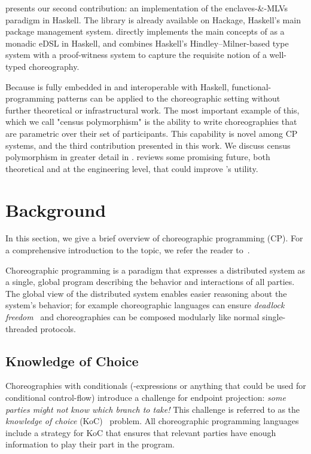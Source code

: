  presents our second contribution: an implementation of the enclaves-\&-MLVs paradigm in Haskell.
The \MultiChor library is already available on Hackage, Haskell's main package management system.
\MultiChor directly implements the main concepts of \HLSCentral as a monadic eDSL in Haskell,
and combines Haskell's Hindley–Milner-based type system with a proof-witness system
to capture the requisite notion of a well-typed choreography.

Because \MultiChor is fully embedded in and interoperable with Haskell,
functional-programming patterns can be applied to the choreographic setting without further theoretical or infrastructural work.
The most important example of this, which we call "census polymorphism" is the ability to write choreographies
that are parametric over their set of participants.
This capability is novel among CP systems, and the third contribution presented in this work.
We discuss census polymorphism in greater detail in .
 reviews some promising future, both theoretical and at the engineering level,
that could improve \MultiChor's utility.



\section{Background}
\label{sec:background}
In this section, we give a brief overview of choreographic programming (CP).
For a comprehensive introduction to the topic, we refer the reader to~\cite{montesi_book}.

Choreographic programming is a paradigm that expresses a distributed system
as a single, global program describing the behavior and interactions of all parties.
The global view of the distributed system enables easier reasoning about the system's behavior;
for example choreographic languages can ensure \emph{deadlock freedom}~\cite{montesi-carbone-dfbd}
and choreographies can be composed modularly like normal single-threaded protocols.



\subsection{Knowledge of Choice}
\label{sec:knowledge-of-choice}

Choreographies with conditionals
(-expressions or anything that could be used for conditional control-flow)
introduce
a challenge for endpoint projection:
\emph{some parties might not know which branch to take!}
This challenge is referred to as the \emph{knowledge of choice}  (KoC)~\cite{castagna-knowledge-of-choice} problem.
All choreographic programming languages include a strategy for KoC
that ensures that relevant parties have enough information to play their part in the program.

